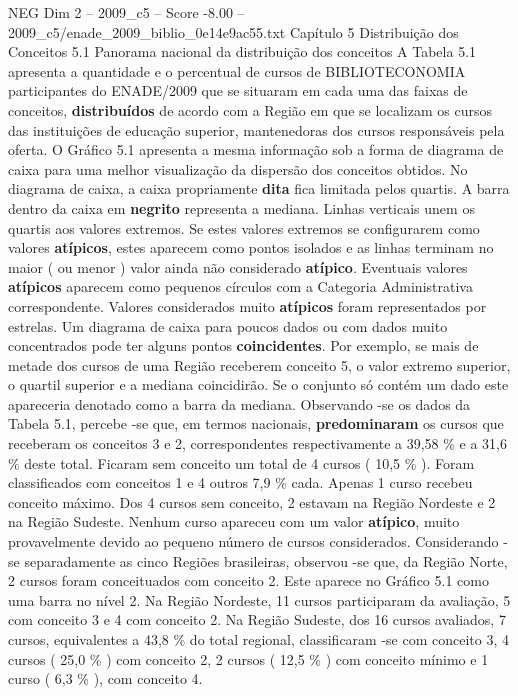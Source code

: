 \begin{textsample}{NEG Dim 2 – 2009\_c5 – Score -8.00 – 2009\_c5/enade\_2009\_biblio\_0e14e9ac55.txt}  \label{ex:f2_neg_010}
Capítulo 5 Distribuição dos Conceitos 5.1 Panorama nacional da distribuição dos conceitos A Tabela 5.1 apresenta a quantidade e o percentual de cursos de BIBLIOTECONOMIA participantes do ENADE/2009 que se situaram em cada uma das faixas de conceitos, \textbf{distribuídos} de acordo com a Região em que se localizam os cursos das instituições de educação superior, mantenedoras dos cursos responsáveis pela oferta.
O Gráfico 5.1 apresenta a mesma informação sob a forma de diagrama de caixa para uma melhor visualização da dispersão dos conceitos obtidos.
No diagrama de caixa, a caixa propriamente \textbf{dita} fica limitada pelos quartis.
A barra dentro da caixa em \textbf{negrito} representa a mediana.
Linhas verticais unem os quartis aos valores extremos.
Se estes valores extremos se configurarem como valores \textbf{atípicos}, estes aparecem como pontos isolados e as linhas terminam no maior ( ou menor ) valor ainda não considerado \textbf{atípico}.
Eventuais valores \textbf{atípicos} aparecem como pequenos círculos com a Categoria Administrativa correspondente.
Valores considerados muito \textbf{atípicos} foram representados por estrelas.
Um diagrama de caixa para poucos dados ou com dados muito concentrados pode ter alguns pontos \textbf{coincidentes}.
Por exemplo, se mais de metade dos cursos de uma Região receberem conceito 5, o valor extremo superior, o quartil superior e a mediana coincidirão.
Se o conjunto só contém um dado este apareceria denotado como a barra da mediana.
Observando -se os dados da Tabela 5.1, percebe -se que, em termos nacionais, \textbf{predominaram} os cursos que receberam os conceitos 3 e 2, correspondentes respectivamente a 39,58 \% e a 31,6 \% deste total.
Ficaram sem conceito um total de 4 cursos ( 10,5 \% ).
Foram classificados com conceitos 1 e 4 outros 7,9 \% cada.
Apenas 1 curso recebeu conceito máximo.
Dos 4 cursos sem conceito, 2 estavam na Região Nordeste e 2 na Região Sudeste.
Nenhum curso apareceu com um valor \textbf{atípico}, muito provavelmente devido ao pequeno número de cursos considerados.
Considerando -se separadamente as cinco Regiões brasileiras, observou -se que, da Região Norte, 2 cursos foram conceituados com conceito 2.
Este aparece no Gráfico 5.1 como uma barra no nível 2.
Na Região Nordeste, 11 cursos participaram da avaliação, 5 com conceito 3 e 4 com conceito 2.
Na Região Sudeste, dos 16 cursos avaliados, 7 cursos, equivalentes a 43,8 \% do total regional, classificaram -se com conceito 3, 4 cursos ( 25,0 \% ) com conceito 2, 2 cursos ( 12,5 \% ) com conceito mínimo e 1 curso ( 6,3 \% ), com conceito 4.

\end{textsample}
